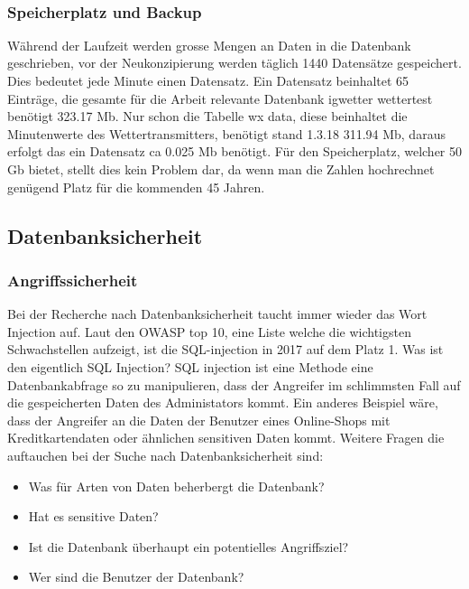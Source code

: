 \\

\subsubsection{Speicherplatz und Backup}
Während der Laufzeit werden grosse Mengen an Daten in die Datenbank geschrieben, vor der Neukonzipierung werden täglich 1440 Datensätze gespeichert. Dies bedeutet jede Minute einen Datensatz. Ein Datensatz beinhaltet 65 Einträge, die gesamte für die Arbeit relevante Datenbank igwetter wettertest benötigt 323.17  Mb. Nur schon die Tabelle wx data, diese beinhaltet die Minutenwerte des Wettertransmitters, benötigt stand 1.3.18 311.94 Mb, daraus erfolgt das ein Datensatz ca 0.025 Mb benötigt. Für den Speicherplatz, welcher 50 Gb bietet, stellt dies kein Problem dar, da wenn man die Zahlen hochrechnet genügend Platz für die kommenden 45 Jahren.\\

\subsection{Datenbanksicherheit}
\subsubsection{Angriffssicherheit}

Bei der Recherche nach Datenbanksicherheit taucht immer wieder das Wort Injection auf. Laut den OWASP top 10, eine Liste welche die wichtigsten Schwachstellen aufzeigt, ist die SQL-injection in 2017 auf dem Platz 1. Was ist den eigentlich SQL Injection? SQL injection ist eine Methode eine Datenbankabfrage so zu manipulieren, dass der Angreifer im schlimmsten Fall auf die gespeicherten Daten des Administators kommt. Ein anderes Beispiel wäre, dass der Angreifer an die Daten der Benutzer eines Online-Shops mit Kreditkartendaten oder ähnlichen sensitiven Daten kommt.
Weitere Fragen die auftauchen bei der Suche nach Datenbanksicherheit sind:
\begin{itemize}
\item Was für Arten von Daten beherbergt die Datenbank?
\item Hat es sensitive Daten?
\item Ist die Datenbank überhaupt ein potentielles Angriffsziel?
\item Wer sind die Benutzer der Datenbank?
\end{itemize}

